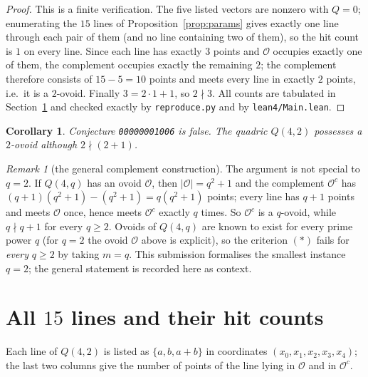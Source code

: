 \documentclass[11pt]{article}
\newtheorem{corollary}[theorem]{Corollary}
\theoremstyle{definition}
\theoremstyle{remark}
\newtheorem{remark}[theorem]{Remark}
\newcommand{\ov}{\mathcal{O}}
\begin{document}
\begin{proof}
This is a finite verification. The five listed vectors are nonzero with
$Q=0$; enumerating the $15$ lines of Proposition~\ref{prop:params} gives exactly
one line through each pair of them (and no line containing two of them), so the
hit count is $1$ on every line. Since each line has exactly $3$ points and
$\ov$ occupies exactly one of them, the complement occupies exactly the
remaining $2$; the complement therefore consists of $15-5 = 10$ points and meets
every line in exactly $2$ points, i.e.\ it is a $2$-ovoid. Finally
$3 = 2 \cdot 1 + 1$, so $2 \nmid 3$. All counts are tabulated in
Section~\ref{sec:table} and checked exactly by \texttt{reproduce.py} and by
\texttt{lean4/Main.lean}.
\end{proof}

\begin{corollary}
Conjecture \texttt{00000001006} is false. The quadric $Q(4,2)$ possesses a
$2$-ovoid although $2 \nmid (2+1)$.
\end{corollary}

\begin{remark}[the general complement construction]
The argument is not special to $q=2$. If $Q(4,q)$ has an ovoid $\ov$, then
$|\ov| = q^2+1$ and the complement $\ov^{c}$ has $(q+1)(q^2+1) - (q^2+1) =
q(q^2+1)$ points; every line has $q+1$ points and meets $\ov$ once, hence meets
$\ov^{c}$ exactly $q$ times. So $\ov^{c}$ is a $q$-ovoid, while $q \nmid q+1$
for every $q \ge 2$. Ovoids of $Q(4,q)$ are known to exist for every prime
power $q$ (for $q=2$ the ovoid $\ov$ above is explicit), so the criterion
$(\ast)$ fails for \emph{every} $q \ge 2$ by taking $m = q$. This submission
formalises the smallest instance $q=2$; the general statement is recorded here
as context.
\end{remark}

\section{All $15$ lines and their hit counts}
\label{sec:table}

Each line of $Q(4,2)$ is listed as $\{a,b,a+b\}$ in coordinates
$(x_0,x_1,x_2,x_3,x_4)$; the last two columns give the number of points of the
line lying in $\ov$ and in $\ov^{c}$.
\end{document}
